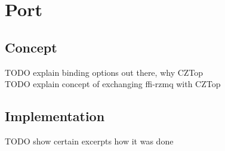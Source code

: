 \chapter{Port}\label{ch:port}
\section{Concept}
TODO explain binding options out there, why CZTop\\
TODO explain concept of exchanging ffi-rzmq with CZTop\\

\section{Implementation}
TODO show certain excerpts how it was done

